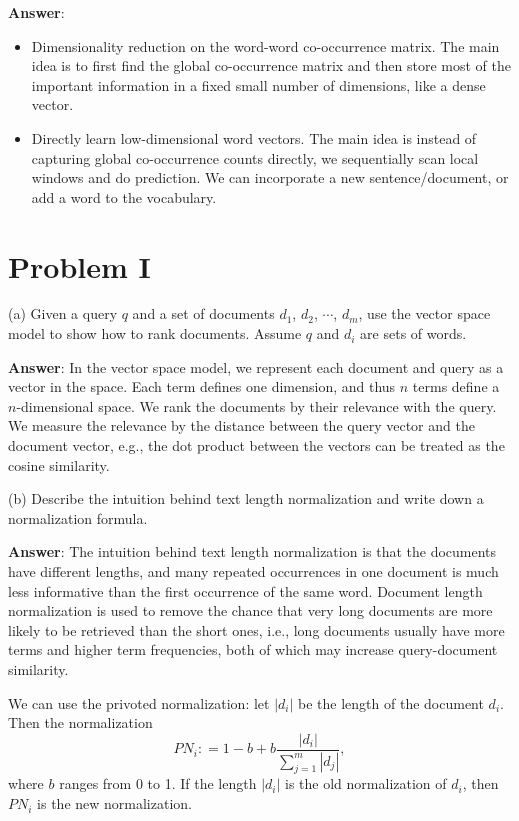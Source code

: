 \documentclass{article}
\begin{document}
{\bf Answer}:
\begin{itemize}
\item Dimensionality reduction on the word-word co-occurrence matrix. The main idea is to first find the global co-occurrence matrix and then store most of the important information in a fixed small number of dimensions, like a dense vector.
\item Directly learn low-dimensional word vectors. The main idea is instead of capturing global co-occurrence counts directly, we sequentially scan local windows and do prediction. We can incorporate a new sentence/document, or add a word to the vocabulary.
\end{itemize}

\section{Problem I}
(a) Given a query $q$ and a set of documents $d_1$, $d_2$, $\cdots$, $d_m$, use the vector space model to show how to rank documents. Assume $q$ and $d_i$ are sets of words.

{\bf Answer}:
In the vector space model, we represent each document and query as a vector in the space. Each term defines one dimension, and thus $n$ terms define a $n$-dimensional space. We rank the documents by their relevance with the query. We measure the relevance by the distance between the query vector and the document vector, e.g., the dot product between the vectors can be treated as the cosine similarity.

(b) Describe the intuition behind text length normalization and write down a normalization formula.

{\bf Answer}:
The intuition behind text length normalization is that the documents have different lengths, and many repeated occurrences in one document is much less informative than the first occurrence of the same word. Document length normalization is used to remove the chance that very long documents are more likely to be retrieved than the short ones, i.e., long documents usually have more terms and higher term frequencies, both of which may increase query-document similarity.

We can use the privoted normalization: let $|d_i|$ be the length of the document $d_i$. Then the normalization
$$PN_i : = 1- b + b\frac{|d_i|}{\sum_{j=1}^m |d_j|},$$
where $b$ ranges from 0 to 1. If the length $|d_i|$ is the old normalization of $d_i$, then $PN_i$ is the new normalization. 
\end{document}
